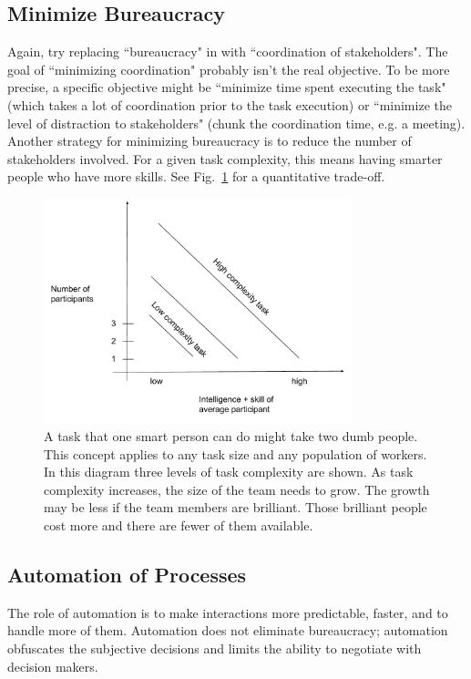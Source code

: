 \subsection{Minimize Bureaucracy}
Again, try replacing ``bureaucracy" in with ``coordination of stakeholders". The goal of ``minimizing coordination" probably isn't the real objective. To be more precise, a specific objective might be ``minimize time spent executing the task" (which takes a lot of coordination prior to the task execution) or ``minimize the level of distraction to stakeholders" (chunk the coordination time, e.g. a meeting). Another strategy for minimizing bureaucracy is to reduce the number of stakeholders involved. For a given task complexity, this means having smarter people who have more skills. See Fig.~\ref{fig:complexity-and-size} for a quantitative trade-off. 


\begin{figure}
\includegraphics[width=0.8\textwidth]{images/people-per-task-for-skill-level.pdf}
\caption{A task that one smart person can do might take two dumb people. This concept applies to any task size and any population of workers. In this diagram three levels of task complexity are shown. As task complexity increases, the size of the team needs to grow. The growth may be less if the team members are brilliant. Those brilliant people cost more and there are fewer of them available.}
\label{fig:complexity-and-size}
\end{figure}


\subsection{Automation of Processes}

The role of automation is to make interactions more predictable, faster, and to handle more of them. Automation does not eliminate bureaucracy; automation obfuscates the subjective decisions and limits the ability to negotiate with decision makers.

